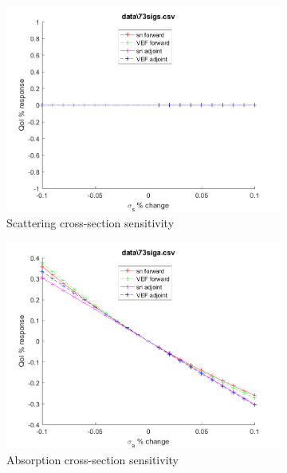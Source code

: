 \documentclass{article}
\begin{document}
\begin{figure}[H]
\begin{subfigure}{.5\textwidth}
  \includegraphics[width=.98\linewidth]{IanProposal/figures2/73sigsSens.png}
  \caption{Scattering cross-section sensitivity}
  \label{fig:sfig2}
\end{subfigure}%
\begin{subfigure}{.5\textwidth}
  \centering
  \includegraphics[width=.98\linewidth]{IanProposal/figures2/73sigaSens.png}
  \caption{Absorption cross-section sensitivity}
  \label{fig:sfig5}
\end{subfigure}%
\caption{}
\label{fig:fig}
\end{figure}
\newpage

\end{document}
